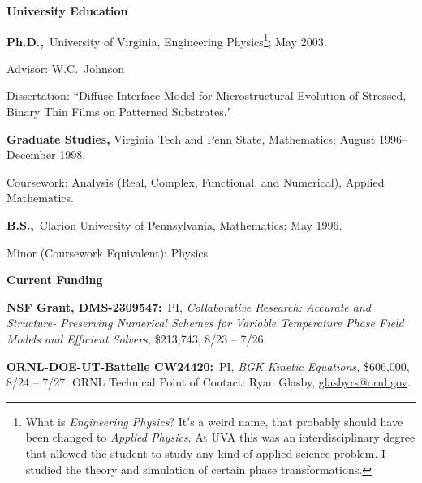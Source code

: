 \documentclass[11pt]{letter}
\begin{document}
	\smallskip
  
{\LARGE\bf  University Education}
    \begin{description}
    \item
\textbf{Ph.D.,}~University of Virginia, Engineering Physics\footnote{What is \emph{Engineering Physics}? It's a weird name, that probably should have been changed to \emph{Applied Physics}. At UVA this was an interdisciplinary degree that allowed the student to study any kind of applied science problem. I studied the theory and simulation of certain phase transformations.}; May 2003.
    \begin{description}
    \item
Advisor: W.C.~Johnson
    \item
Dissertation: ``Diffuse Interface Model for Microstructural Evolution of Stressed, Binary Thin Films on Patterned Substrates."
    \end{description}
    \item
 \textbf{Graduate Studies,} Virginia Tech and Penn State, Mathematics; August 1996--December 1998.
    \begin{description}
    \item
Coursework: Analysis (Real, Complex, Functional, and Numerical), Applied Mathematics.
    \end{description}
    \item
\textbf{B.S.,}~Clarion University of Pennsylvania, Mathematics; May
1996.
    \begin{description}
    \item
Minor (Coursework Equivalent): Physics
    \end{description}
    \end{description}
	
	\smallskip

	
{\LARGE\bf Current Funding}
    \begin{description}
    
	\item
\textbf{NSF Grant, DMS-2309547:}~PI, {\sl Collaborative Research: Accurate and Structure- Preserving Numerical Schemes for Variable Temperature Phase Field Models and Efficient Solvers,} \$213,743, 8/23 -- 7/26.

    \item
\textbf{ORNL-DOE-UT-Battelle CW24420:}~PI, {\sl BGK Kinetic Equations,} \$606,000, 8/24 -- 7/27. ORNL Technical Point of Contact: Ryan Glasby, \url{glasbyrs@ornl.gov}.
    
    \end{description}
    
\end{document}
